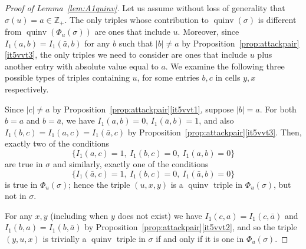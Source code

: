 \documentclass[11pt]{article}
\theoremstyle{definition}
\numberwithin{equation}{section}
\DeclareMathOperator{\quinv}{quinv}
\newcommand\cellL[4]{
\def\i{#1} \def\j{#2} \def\entry{#3} \def\labl{#4}
\draw (\j-1,-\i)--(\j,-\i)--(\j,-\i+1)--(\j-1,-\i+1)--(\j-1,-\i);
\node at (\j-.5,-\i+.5) {\entry};
\node at (\j-1.3,-\i+.8) {\tiny\labl};
}
\begin{document}
\begin{proof}[Proof of Lemma~\ref{lem:A1quinv}]
Let us assume without loss of generality that $\sigma(u)=a\in\mathbb{Z}_+$. The only triples whose contribution to $\quinv(\sigma)$ is different from $\quinv(\Phi_u(\sigma))$ are ones that include $u$. Moreover, since $I_1(a,b)=I_1(\bar{a},b)$ for any $b$ such that $|b| \neq a$ by Proposition~\ref{prop:attackpair}\ref{it5vvt3}, the only triples we need to consider are ones that include $u$ plus another entry with absolute value equal to $a$. We examine the following three possible types of triples containing $u$, for some entries $b,c$ in cells $y,x$ respectively.
\begin{flushleft}
\end{flushleft}
Since $|c|\neq a$ by Proposition~\ref{prop:attackpair}\ref{it5vvt1}, suppose $|b|=a$. For both $b=a$ and $b=\bar{a}$, we have $I_1(a,b)=0$, $I_1(\bar{a},b)=1$, and also $I_1(b,c)=I_1(a,c)=I_1(\bar{a},c)$ by Proposition~\ref{prop:attackpair}\ref{it5vvt3}. Then, exactly two of the conditions
\[\{I_1(a,c)=1,\ I_1(b,c)=0,\  I_1(a,b)=0\}\]
are true in $\sigma$ and similarly, exactly one of the conditions
\[\{I_1(\bar{a},c)=1,\ I_1(b,c)=0,\ I_1(\bar{a},b)=0\}\]
is true in $\Phi_u(\sigma)$; hence the triple $(u,x,y)$ is a $\quinv$ triple in $\Phi_u(\sigma)$, but not in $\sigma$.
\begin{flushleft}
\end{flushleft}
For any $x,y$ (including when $y$ does not exist) we have $I_1(c,a)=I_1(c,\bar{a})$ and $I_1(b,a)=I_1(b,\bar{a})$ by Proposition~\ref{prop:attackpair}\ref{it5vvt2}, and so the triple $(y,u,x)$ is trivially a $\quinv$ triple in $\sigma$ if and only if it is one in $\Phi_u(\sigma)$.


\end{proof}
\end{document}
